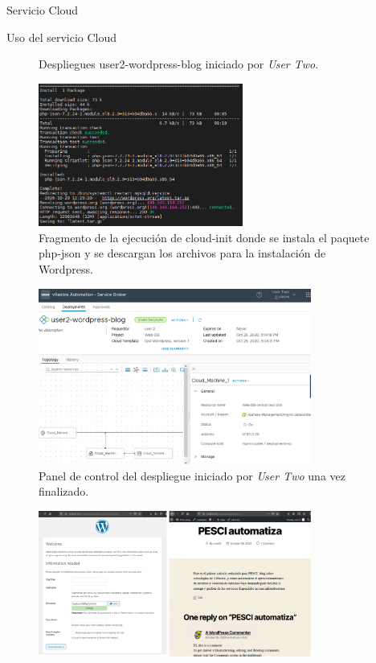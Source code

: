 \begin{subsection}{Servicio Cloud}
\begin{subsubsection}{Uso del servicio Cloud}
\begin{figure}[h]
            \caption{Despliegues user2-wordpress-blog iniciado por \textit{User Two}.}
            \label{fig:deployment-user-2}
        \end{figure}
        \FloatBarrier
        \begin{figure}[h]
            \centering
            \includegraphics[width=0.6\textwidth]{imaxes/pruebaconcepto/vrealize/cloud-init-commands-wordpress.png}
            \caption{Fragmento de la ejecución de cloud-init donde se instala el paquete php-json y se descargan los archivos para la instalación de Wordpress.}
            \label{fig:cloud-init-user-2}
        \end{figure}
        \FloatBarrier
        \begin{figure}[h]
            \centering
            \includegraphics[width=0.8\textwidth]{imaxes/pruebaconcepto/vrealize/user-2-deploy-fin.png}
            \caption{Panel de control del despliegue iniciado por \textit{User Two} una vez finalizado.}
            \label{fig:control-panel-user2}
        \end{figure}
        \FloatBarrier
        \begin{figure}[h]
            \centering
            \includegraphics[width=0.8\textwidth]{imaxes/pruebaconcepto/vrealize/wordpress-installation.png}

\end{figure}
\end{subsubsection}
\end{subsection}
